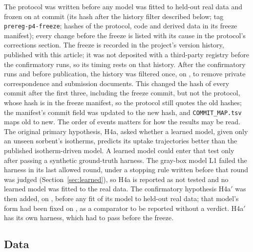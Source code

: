 \documentclass[12pt]{article}
\begin{document}
The protocol was written before any model was fitted to held-out real data and frozen on  at commit
 (its hash after the history filter described below; tag \texttt{prereg-p4-freeze}; hashes of the protocol, code and derived data in its freeze manifest);
every change before the freeze is listed with its cause in the protocol's
corrections section. The freeze is recorded in the project's version history, published with this article; it was
not deposited with a third-party registry before the confirmatory runs, so its timing rests on that history. After the
confirmatory runs and before publication, the history was filtered once, on , to remove private
correspondence and submission documents. This changed the hash of every commit after the first three, including the freeze commit, but not the protocol, whose hash is in the
freeze manifest, so the protocol still quotes the old hashes; the manifest's commit field was updated to the new
hash, and \texttt{COMMIT\_MAP.tsv} maps old to new. The
order of events matters for how the results may be read. The original primary hypothesis,
H4a, asked whether a learned model, given only an unseen sorbent's isotherms, predicts its uptake trajectories better
than the published isotherm-driven model. A learned model could enter that test only after passing a synthetic
ground-truth harness. The gray-box model L1 failed the harness in its last allowed round, under a stopping rule
written before that round was judged (Section~\ref{sec:learned}), so H4a is reported as not tested and no learned
model was fitted to the real data. The confirmatory hypothesis H4a$'$ was then added, on , before any fit of its model to
held-out real data; that model's form had been fixed on , as a comparator to be
reported without a verdict. H4a$'$ has its own harness, which had to pass before the freeze.

\subsection{Data}
\end{document}

